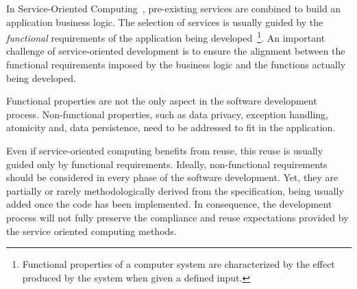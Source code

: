 




In Service-Oriented Computing~\cite{Papazoglou2007}, pre-existing services are
combined to build an application business logic.
The selection of services is usually guided by the \textit{functional} requirements of the application being developed~\cite{2,decastro1,PapazoglouH06}\footnote{Functional properties of a computer system are characterized by the effect produced by the system when given a defined input.}.
An important challenge of service-oriented development is  to ensure the alignment between the functional requirements imposed by the business logic and the functions actually being developed.

Functional properties are not the only  aspect in the software development process.
Non-functional properties, such as data privacy, exception handling, atomicity  and, data persistence, need to be addressed  to fit in the application.

Even if service-oriented computing benefits from reuse, this reuse is usually guided only by functional requirements.
%
Ideally, non-functional requirements should be considered in every phase of the software development.
Yet,  they are partially or rarely methodologically derived from the specification, being usually added once the code has been implemented. 
In consequence, the development process will not fully preserve the compliance and reuse expectations provided by the service oriented computing methods.


